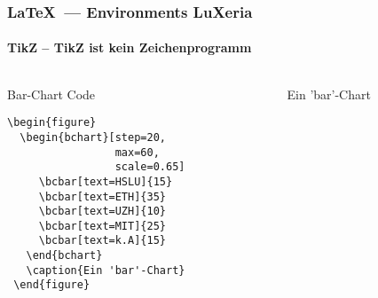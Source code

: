 \begin{frame}[fragile]
    \frametitle{\LaTeX~--- Environments \hfill{} \footnotesize{LuXeria}}
    \framesubtitle{TikZ -- TikZ ist kein Zeichenprogramm}
    \begin{columns}
        \begin{column}{5cm}
            \begin{block}{Bar-Chart Code}
                \begin{lstlisting}
\begin{figure}
  \begin{bchart}[step=20, 
                 max=60,
                 scale=0.65]
     \bcbar[text=HSLU]{15}
     \bcbar[text=ETH]{35}
     \bcbar[text=UZH]{10}
     \bcbar[text=MIT]{25}
     \bcbar[text=k.A]{15}
   \end{bchart}
   \caption{Ein 'bar'-Chart}
 \end{figure}
                \end{lstlisting}
            \end{block}
        \end{column}
        
        \begin{column}{6cm}
            \begin{figure}
                \begin{bchart}[step=10, max=40, scale=0.65]
                \end{bchart}
                \caption{Ein 'bar'-Chart}
            \end{figure}
        \end{column}
    \end{columns}
\end{frame}

